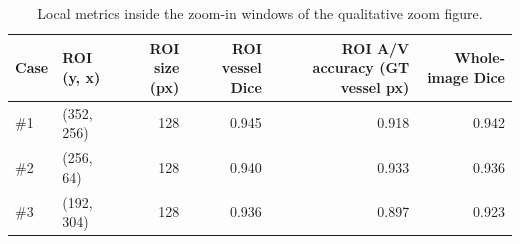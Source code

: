 \begin{table}
\caption{Local metrics inside the zoom-in windows of the qualitative zoom figure.}
\label{tab:qualitative_zoom_metrics}
\begin{tabular}{llrrrr}
\toprule
Case & ROI (y, x) & ROI size (px) & ROI vessel Dice & ROI A/V accuracy (GT vessel px) & Whole-image Dice \\
\midrule
\#1 & (352, 256) & 128 & 0.945 & 0.918 & 0.942 \\
\#2 & (256, 64) & 128 & 0.940 & 0.933 & 0.936 \\
\#3 & (192, 304) & 128 & 0.936 & 0.897 & 0.923 \\
\bottomrule
\end{tabular}
\end{table}
